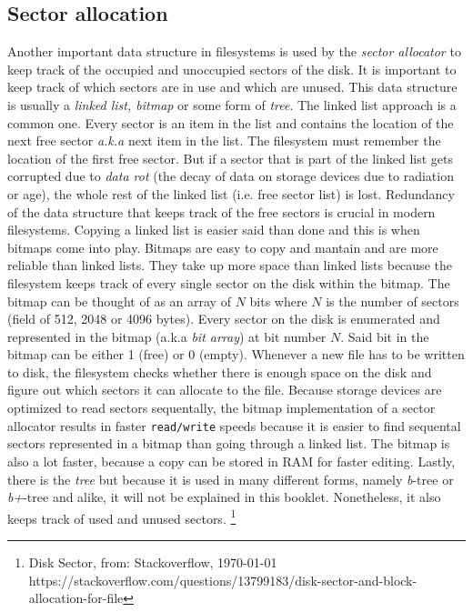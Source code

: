 \subsection{Sector allocation}

Another important data structure in filesystems is used by the \textit{sector allocator} to keep track of the
occupied and unoccupied sectors of the disk. It is important to keep track of which sectors are in use and
which are unused. This data structure is usually a \textit{linked list, bitmap} or some form of \textit{tree}. The
linked list approach is a common one. Every sector is an item in the list and contains the location of
the next free sector \textit{a.k.a} next item in the list. The filesystem must remember the
location of the first free sector. But if a sector that is part of the linked list gets corrupted due
to \textit{data rot} (the decay of data on storage devices due to radiation or age), the whole rest of the
linked list (i.e. free sector list) is lost. Redundancy of the data structure that keeps track of the free sectors is
crucial in modern filesystems. Copying a linked list is easier said than done and this is when bitmaps
come into play. Bitmaps are easy to copy and mantain and are more reliable than linked lists. They
take up more space than linked lists because the filesystem keeps track of every single sector on the
disk within the bitmap. The bitmap can be thought of as an array of $N$ bits where $N$ is the
number of sectors (field of 512, 2048 or 4096 bytes). Every sector on the disk is enumerated and 
represented in the bitmap (a.k.a \textit{bit array}) at bit number $N$. Said bit in the bitmap can be
either 1 (free) or 0 (empty). Whenever a new file has to be written to disk, the filesystem checks
whether there is enough space on the disk and figure out which sectors it can allocate to the file.
Because storage devices are optimized to read sectors sequentally, the bitmap implementation of a
sector allocator results in faster \texttt{read/write} speeds because it is easier to find sequental sectors
represented in a bitmap than going through a linked list. The bitmap is also a lot faster, because a
copy can be stored in RAM for faster editing. Lastly, there is the \textit{tree} but because it is used in
many different forms, namely \textit{b}-tree or \textit{b+}-tree and alike, it will not be explained in this booklet.
Nonetheless, it also keeps track of used and unused sectors. \footnote{Disk Sector, from: Stackoverflow, \today  \\ https://stackoverflow.com/questions/13799183/disk-sector-and-block-allocation-for-file}


